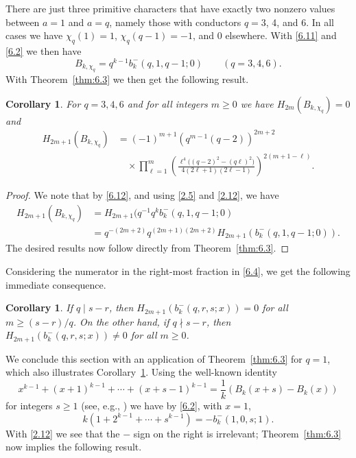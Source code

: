 \documentclass{amsart}
\theoremstyle{plain}
\newtheorem{corollary}[theorem]{Corollary}
\numberwithin{equation}{section}
\begin{document}
There are just three primitive characters that have exactly two nonzero values
between $a=1$ and $a=q$, namely those with conductors $q=3$, 4, and 6. In all
cases we have $\chi_q(1)=1$, $\chi_q(q-1)=-1$, and 0 elsewhere. With 
\eqref{6.11} and \eqref{6.2} we then have
\begin{equation}\label{6.12}
B_{k,\chi_q} = q^{k-1}b_k^{-}(q,1,q-1;0)\qquad(q=3, 4, 6).
\end{equation}
With Theorem~\ref{thm:6.3} we then get the following result.

\begin{corollary}\label{cor:6.5}
For $q=3, 4, 6$ and for all integers $m\geq 0$ we have $H_{2m}(B_{k,\chi_q})=0$
and
\begin{align}
H_{2m+1}(B_{k,\chi_q})&=(-1)^{m+1}\left(q^{m-1}(q-2)\right)^{2m+2}\label{6.13}\\
&\quad\times\prod_{\ell=1}^m \left(\frac{\ell^4\big((q-2)^2-(q\ell)^2\big)}{4(2\ell+1)(2\ell-1)}\right)^{2(m+1-\ell)}.\nonumber
\end{align}
\end{corollary}

\begin{proof}
We note that by \eqref{6.12}, and using \eqref{2.5} and \eqref{2.12}, we have
\begin{align*}
H_{2m+1}(B_{k,\chi_q}) &= H_{2m+1}(q^{-1}q^kb_k^{-}(q,1,q-1;0)\\
&= q^{-(2m+2)}q^{(2m+1)(2m+2)}H_{2m+1}(b_k^{-}(q,1,q-1;0)).
\end{align*}
The desired results now follow directly from Theorem~\ref{thm:6.3}.
\end{proof}

Considering the numerator in the right-most fraction in \eqref{6.4}, we get the
following immediate consequence.

\begin{corollary}\label{cor:6.6}
If $q\mid s-r$, then $H_{2m+1}(b_k^{-}(q,r,s;x))=0$ for all $m\geq(s-r)/q$. 
On the other hand, if $q\nmid s-r$, then $H_{2m+1}(b_k^{-}(q,r,s;x))\neq 0$ 
for all $m\geq 0$.
\end{corollary}

We conclude this section with an application of Theorem~\ref{thm:6.3} for $q=1$,
which also illustrates Corollary~\ref{cor:6.6}. Using the well-known identity
\[
x^{k-1}+(x+1)^{k-1}+\cdots+(x+s-1)^{k-1}=\frac{1}{k}\left(B_k(x+s)-B_k(x)\right)
\]
for integers $s\geq 1$ (see, e.g., \cite[Eq.~24.4.9]{DLMF}) we have by
\eqref{6.2}, with $x=1$,
\begin{equation}\label{6.14}
k\left(1+2^{k-1}+\cdots+s^{k-1}\right) = -b_k^{-}(1,0,s;1).
\end{equation}
With \eqref{2.12} we see that the $-$ sign on the right is irrelevant; 
Theorem~\ref{thm:6.3} now implies the following result.
\end{document}
